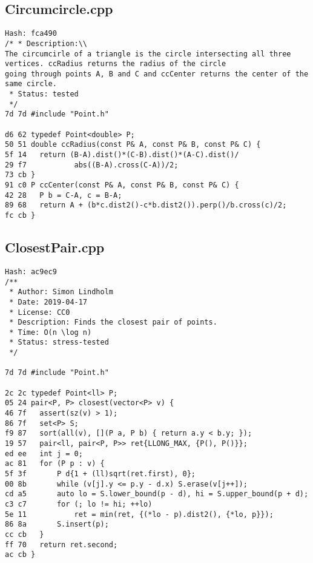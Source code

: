\documentclass[11pt, a4paper, twoside]{article}
\begin{document}
\subsection{Circumcircle.cpp}
\begin{lstlisting}
Hash: fca490
/* * Description:\\
The circumcirle of a triangle is the circle intersecting all three vertices. ccRadius returns the radius of the circle 
going through points A, B and C and ccCenter returns the center of the same circle.
 * Status: tested
 */
7d 7d #include "Point.h"

d6 62 typedef Point<double> P;
50 51 double ccRadius(const P& A, const P& B, const P& C) {
5f 14 	return (B-A).dist()*(C-B).dist()*(A-C).dist()/
29 f7 			abs((B-A).cross(C-A))/2;
73 cb }
91 c0 P ccCenter(const P& A, const P& B, const P& C) {
42 28 	P b = C-A, c = B-A;
89 68 	return A + (b*c.dist2()-c*b.dist2()).perp()/b.cross(c)/2;
fc cb }
\end{lstlisting}

\subsection{ClosestPair.cpp}
\begin{lstlisting}
Hash: ac9ec9
/**
 * Author: Simon Lindholm
 * Date: 2019-04-17
 * License: CC0
 * Description: Finds the closest pair of points.
 * Time: O(n \log n)
 * Status: stress-tested
 */

7d 7d #include "Point.h"

2c 2c typedef Point<ll> P;
05 24 pair<P, P> closest(vector<P> v) {
46 7f 	assert(sz(v) > 1);
86 7f 	set<P> S;
f9 87 	sort(all(v), [](P a, P b) { return a.y < b.y; });
19 57 	pair<ll, pair<P, P>> ret{LLONG_MAX, {P(), P()}};
ed ee 	int j = 0;
ac 81 	for (P p : v) {
5f 3f 		P d{1 + (ll)sqrt(ret.first), 0};
00 8b 		while (v[j].y <= p.y - d.x) S.erase(v[j++]);
cd a5 		auto lo = S.lower_bound(p - d), hi = S.upper_bound(p + d);
c3 c7 		for (; lo != hi; ++lo)
5e 11 			ret = min(ret, {(*lo - p).dist2(), {*lo, p}});
86 8a 		S.insert(p);
cc cb 	}
ff 70 	return ret.second;
ac cb }
\end{lstlisting}
\end{document}
